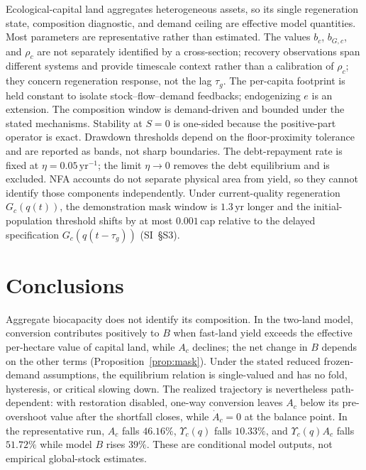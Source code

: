 \documentclass[preprint,12pt,authoryear]{elsarticle}
\newcommand{\Ups}{\Upsilon_c}
\begin{document}
Ecological-capital land aggregates heterogeneous assets, so its single regeneration state, composition diagnostic, and demand ceiling are effective model quantities. Most parameters are representative rather than estimated. The values $b_c$, $b_{G,c}$, and $\rho_c$ are not separately identified by a cross-section; recovery observations span different systems and provide timescale context rather than a calibration of $\rho_c$; they concern regeneration response, not the lag $\tau_g$. The per-capita footprint is held constant to isolate stock--flow--demand feedbacks; endogenizing $e$ is an extension. The composition window is demand-driven and bounded under the stated mechanisms. Stability at $S=0$ is one-sided because the positive-part operator is exact. Drawdown thresholds depend on the floor-proximity tolerance and are reported as bands, not sharp boundaries. The debt-repayment rate is fixed at $\eta=0.05\,\mathrm{yr}^{-1}$; the limit $\eta\to0$ removes the debt equilibrium and is excluded. NFA accounts do not separate physical area from yield, so they cannot identify those components independently. Under current-quality regeneration $G_c(q(t))$, the demonstration mask window is $1.3$\,yr longer and the initial-population threshold shifts by at most $0.001$\,cap relative to the delayed specification $G_c(q(t-\tau_g))$ (SI~\S S3).

\section{Conclusions}\label{sec:conclusions}

Aggregate biocapacity does not identify its composition. In the two-land model, conversion contributes positively to $B$ when fast-land yield exceeds the effective per-hectare value of capital land, while $A_c$ declines; the net change in $B$ depends on the other terms (Proposition~\ref{prop:mask}). Under the stated reduced frozen-demand assumptions, the equilibrium relation is single-valued and has no fold, hysteresis, or critical slowing down. The realized trajectory is nevertheless path-dependent: with restoration disabled, one-way conversion leaves $A_c$ below its pre-overshoot value after the shortfall closes, while $\dot A_c=0$ at the balance point. In the representative run, $A_c$ falls $46.16\%$, $\Ups(q)$ falls $10.33\%$, and $\Ups(q)A_c$ falls $51.72\%$ while model $B$ rises $39\%$. These are conditional model outputs, not empirical global-stock estimates.
\end{document}
